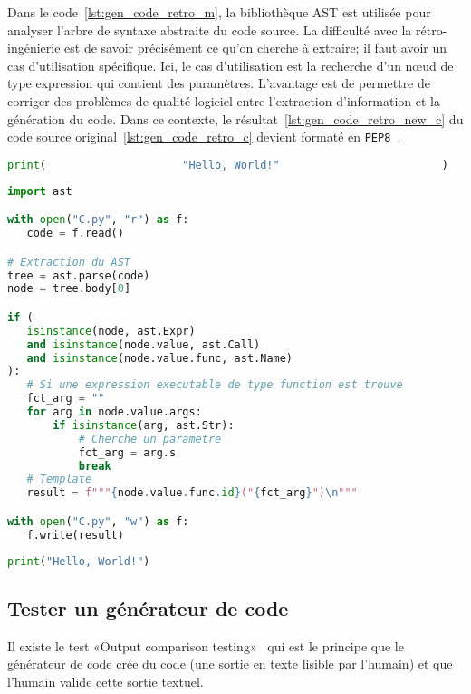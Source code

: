 Dans le code~\ref{lst:gen_code_retro_m}, la bibliothèque AST est utilisée pour analyser l’arbre de syntaxe abstraite du code source. La difficulté avec la rétro-ingénierie est de savoir précisément ce qu’on cherche à extraire; il faut avoir un cas d’utilisation spécifique. Ici, le cas d’utilisation est la recherche d’un nœud de type expression qui contient des paramètres. L’avantage est de permettre de corriger des problèmes de qualité logiciel entre l’extraction d’information et la génération du code. Dans ce contexte, le résultat~\ref{lst:gen_code_retro_new_c} du code source original~\ref{lst:gen_code_retro_c} devient formaté en \texttt{PEP8~\cite{python_pep8}}.

\begin{lstlisting}[language=Python, upquote=true, caption={C mal formaté - fichier C.py}, label={lst:gen_code_retro_c}]
print(                     "Hello, World!"                         )
\end{lstlisting}

\begin{lstlisting}[language=Python, upquote=true, caption={M qui extrait µ$_C$ pour générer C.py}, label={lst:gen_code_retro_m}]
import ast

with open("C.py", "r") as f:
   code = f.read()

# Extraction du AST
tree = ast.parse(code)
node = tree.body[0]

if (
   isinstance(node, ast.Expr)
   and isinstance(node.value, ast.Call)
   and isinstance(node.value.func, ast.Name)
):
   # Si une expression executable de type function est trouve
   fct_arg = ""
   for arg in node.value.args:
       if isinstance(arg, ast.Str):
           # Cherche un parametre
           fct_arg = arg.s
           break
   # Template
   result = f"""{node.value.func.id}("{fct_arg}")\n"""

with open("C.py", "w") as f:
   f.write(result)
\end{lstlisting}

\begin{lstlisting}[language=Python, upquote=true, caption={C corrigé - fichier C.py}, label={lst:gen_code_retro_new_c}]
print("Hello, World!")
\end{lstlisting}

\subsection{Tester un générateur de code}

Il existe le test «Output comparison testing»~\cite{wikipedia_test_informatique} qui est le principe que le générateur de code crée du code (une sortie en texte lisible par l'humain) et que l'humain valide cette sortie textuel.

